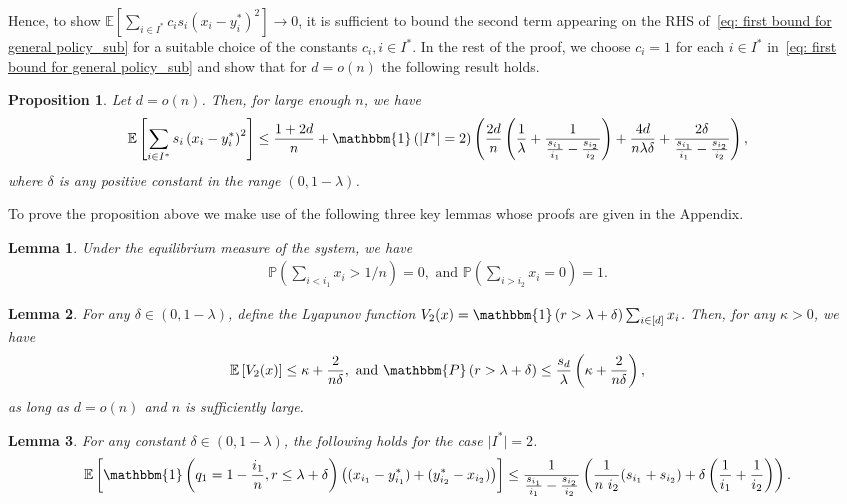 \documentclass[a4paper]{article}
\def\ind{\mathbbm{1}}
\theoremstyle{plain}
\newtheorem{lem}{Lemma}
\newtheorem{proposition}{Proposition}
\theoremstyle{definition}
\theoremstyle{case}
\theoremstyle{remark}
\newcommand{\brac}[1]{\left(#1\right)}
\newcommand{\sbrac}[1]{\left[#1\right]}
\newcommand{\expect}[1]{\mathbb{E}\sbrac{#1}}
\newcommand{\abs}[1]{\lvert #1 \rvert}
\begin{document}
%
Hence, to show $\expect{\sum_{i \in I^*} c_i s_i \brac{x_i - y_i^*}^2} \to 0$, it is sufficient to bound the second term appearing on the RHS of~\eqref{eq: first bound for general policy_sub} for a suitable choice of the constants $c_i, i\in I^*$. In the rest of the proof, we choose $c_i=1$ for each $i\in I^*$ in~\eqref{eq: first bound for general policy_sub} and show that for $d=o(n)$ the following result holds.
%
\begin{proposition} \label{prop: full access}
Let $d = o(n)$. Then, for large enough $n$, we have 
\begin{equation}
\expect{\sum_{i \in I^*} s_i \brac{x_i - y_i^*}^2} \leq  \frac{1+2d}{n}
+ \ind\brac{\abs{I^*}=2}\brac{\frac{2d}{n}\brac{\frac{1}{\lambda}+\frac{1}{\frac{s_{i_1}}{i_1}-\frac{s_{i_2}}{i_2}}}+\frac{4d}{n\lambda\delta}+\frac{2\delta}{\frac{s_{i_1}}{i_1}-\frac{s_{i_2}}{i_2}}},
\end{equation}
%
where $\delta$ is any positive constant in the range $(0, 1-\lambda)$.
\end{proposition}

To prove the proposition above we make use of the following three key lemmas whose proofs are given in the Appendix.

\begin{lem} \label{lemma: SSC_two dim}
Under the equilibrium measure of the system, we have 
\begin{align}
    \mathbb{P} \brac{\sum_{i < i_1} x_i > 1/n} = 0,\label{eq: sum_less than i_1} \text{ and } \mathbb{P}\brac{\sum_{i>i_2} x_i  = 0} =1.
\end{align}
\end{lem}

\begin{lem} \label{lemma: second Lyapunov function,sublinear}
  For any $\delta \in \brac{0, 1- \lambda}$, define the Lyapunov function $V_2(x) = \ind \brac{r > \lambda+\delta}\sum_{i \in [d]} x_i$.
  Then, for any $\kappa >0$, we have 
  \begin{equation}
  \expect{V_2(x)} \leq \kappa+\frac{2}{ n\delta}, \text{ and } \mathbbm{P}\brac{r > \lambda + \delta} \leq \frac{s_d}{\lambda}\brac{\kappa+\frac{2}{ n\delta}},   
  \end{equation}
  as long as $d = o(n)$ and $n$ is sufficiently large. 
  \end{lem}

\begin{lem} \label{lemma: two comp_third bound}
For any constant $\delta \in (0, 1 - \lambda)$, the following holds for the case $\abs{I^*}=2$. 
\begin{equation}
 \expect{\ind\brac{q_1= 1- \frac{i_1}{n}, r \leq \lambda + \delta} \brac{(x_{i_1} - y_{i_1}^*)+(y_{i_2}^* - x_{i_2})}} 
         \leq \frac{1}{\frac{s_{i_1}}{i_1}-\frac{s_{i_2}}{i_2}} \brac{\frac{1}{n~i_2}(s_{i_1}+s_{i_2})+ \delta\brac{\frac{1}{i_1}+\frac{1}{i_2}}}.
\end{equation}
\end{lem}
\end{document}
